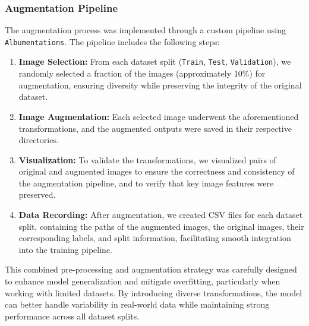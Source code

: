 \documentclass[10pt,twocolumn,letterpaper]{article}
\begin{document}
\subsubsection{Augmentation Pipeline}

The augmentation process was implemented through a custom pipeline using \texttt{Albumentations}. The pipeline includes the following steps:
\begin{enumerate}
    \item \textbf{Image Selection:} From each dataset split (\texttt{Train}, \texttt{Test}, \texttt{Validation}), we randomly selected a fraction of the images (approximately 10\%) for augmentation, ensuring diversity while preserving the integrity of the original dataset.
    
    \item \textbf{Image Augmentation:} Each selected image underwent the aforementioned transformations, and the augmented outputs were saved in their respective directories.
    
    \item \textbf{Visualization:} To validate the transformations, we visualized pairs of original and augmented images to ensure the correctness and consistency of the augmentation pipeline, and to verify that key image features were preserved.
    
    \item \textbf{Data Recording:} After augmentation, we created CSV files for each dataset split, containing the paths of the augmented images, the original images, their corresponding labels, and split information, facilitating smooth integration into the training pipeline.
\end{enumerate}

This combined pre-processing and augmentation strategy was carefully designed to enhance model generalization and mitigate overfitting, particularly when working with limited datasets. By introducing diverse transformations, the model can better handle variability in real-world data while maintaining strong performance across all dataset splits.
\end{document}
